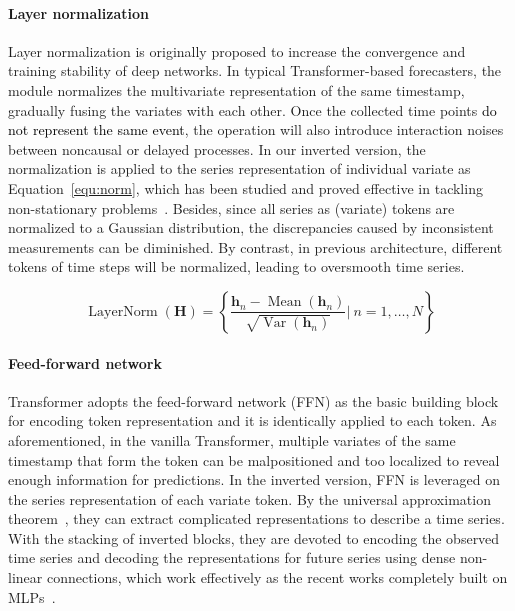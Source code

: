 \documentclass{article} %
\newcommand{\update}[1]{{\textcolor{black}{#1}}}
\begin{document}
\paragraph{Layer normalization} Layer normalization \citep{LayerNorm} is originally proposed to increase the convergence and training stability of deep networks. In typical Transformer-based forecasters, the module normalizes the multivariate representation of the same timestamp, gradually fusing the variates with each other. Once the collected time points \update{do not represent the same event}, the operation will also introduce interaction noises between noncausal or delayed processes. In our inverted version, the normalization is applied to the series representation of individual variate as Equation~\ref{equ:norm}, which has been studied and proved effective in tackling non-stationary problems~\citep{kim2021reversible, Stationary}. Besides, since all series as (variate) tokens are normalized to a Gaussian distribution, the discrepancies caused by inconsistent measurements can be diminished. By contrast, in previous architecture, different tokens of time steps will be normalized, leading to oversmooth time series.

\begin{equation}\label{equ:norm}
    \operatorname{LayerNorm}(\mathbf{H}) = \left\{\frac{\mathbf{h}_n - \operatorname{Mean}(\mathbf{h}_n)}{ \sqrt{\operatorname{Var}(\mathbf{h}_n)}} \bigg| \ n=1,\dots,N \right\}
\end{equation}

\paragraph{Feed-forward network}
Transformer adopts the feed-forward network (FFN) as the basic building block for encoding token representation and it is identically applied to each token. As aforementioned, in the vanilla Transformer, multiple variates of the same timestamp that form the token can be malpositioned and too localized to reveal enough information for predictions. In the inverted version, FFN is leveraged on the series representation of each variate token. By the universal approximation theorem~\citep{hornik1991approximation}, they can extract complicated representations to describe a time series. With the stacking of inverted blocks, they are devoted to encoding the observed time series and decoding the representations for future series using dense non-linear connections, which work effectively as the recent works completely built on MLPs~\citep{tolstikhin2021mlp, das2023long}.
\end{document}
